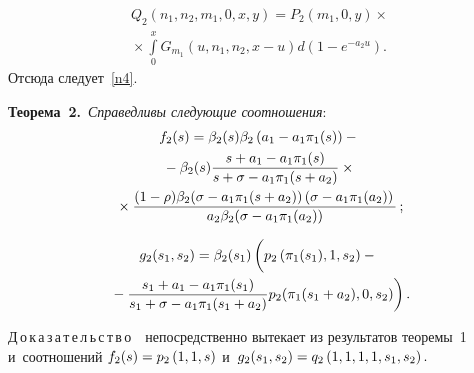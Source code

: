 \begin{multicols}{2}
\noindent
\begin{multline*}
Q_2\left(n_1,n_2,m_1,0,x,y\right)=
P_2\left(m_1,0,y\right)\times{}\\
{}\times
\int\limits_0^xG_{m_1}\left(u,n_1,n_2,x-u\right)d\left(1-e^{-a_2u}\right).
\end{multline*}
Отсюда следует~\eqref{n4}.

\smallskip

\noindent
\textbf{Теорема~2.}\
\textit{Справедливы следующие соотношения}:
\begin{multline*}
f_2(s)=\beta_2(s)\beta_2
\left(a_1-a_1\pi_1(s)\right)-{}\\
{}-\beta_2(s)
\displaystyle\frac{\displaystyle s+a_1-a_1\pi_1(s)\mathstrut}{\displaystyle s+\sigma-a_1\pi_1(s+a_2)\mathstrut}\times{}\\
{}\times\displaystyle\frac{\displaystyle (1-\rho)\beta_2(\sigma-a_1\pi_1(s+a_2))
\left(\sigma-a_1\pi_1(a_2)\right)\mathstrut}{\displaystyle a_2\beta_2(\sigma-a_1\pi_1(a_2))\mathstrut}\,;
\end{multline*}


\vspace*{-12pt}

\noindent
\begin{multline*}
g_2(s_1,s_2)=\beta_2(s_1)\left(
\vphantom{\fr{s_1+a_1-a_1\pi_1(s_1)}{s_1+\sigma-a_1\pi_1(s_1+a_2)}}
p_2\left(\pi_1(s_1),1,s_2\right)-{}\right.\\
\left.{}-
\fr{s_1+a_1-a_1\pi_1(s_1)}{s_1+\sigma-a_1\pi_1(s_1+a_2)}
p_2(\pi_1(s_1+a_2),0,s_2)\right).
\end{multline*}

\noindent
Д\,о\,к\,а\,з\,а\,т\,е\,л\,ь\,с\,т\,в\,о\ \
 непосредственно вытекает из результатов теоремы~1 и~соотношений
$f_2(s)\hm=p_2\left(1,1,s\right)$ и~$g_2(s_1,s_2)\hm=q_2\left(1,1,1,1,s_1,s_2\right).
$


\smallskip


\end{multicols}
